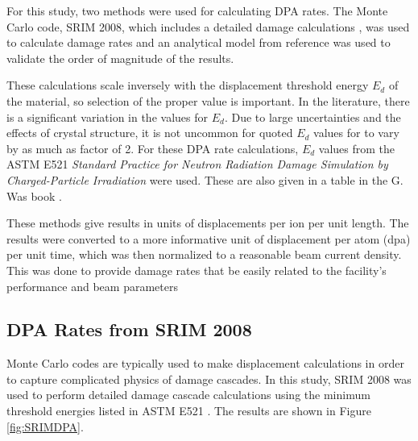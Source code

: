 \documentclass[final,3p,times,twocolumn]{elsarticle} %
\begin{document}
For this study, two methods were used for calculating DPA rates. The Monte Carlo code, SRIM 2008, which includes a detailed damage calculations \cite{SRIM}, was used to calculate damage rates and an analytical model from reference \cite{Was} was used to validate the order of magnitude of the results.  

These calculations scale inversely with the displacement threshold energy $E_d$ of the material, so selection of the proper value is important.  In the literature, there is a significant variation in the values for $E_d$. Due to large uncertainties and the effects of crystal structure, it is not uncommon for quoted $E_d$ values for to vary by as much as factor of 2.   For these DPA rate calculations, $E_d$ values from the ASTM E521 \emph{Standard Practice for Neutron Radiation Damage Simulation by Charged-Particle Irradiation} \cite{ASTME521} were used. These are also given in a table in the G. Was book \cite{Was}.  

These methods give results in units of displacements per ion per unit length.  The results were converted to a more informative unit of displacement per atom (dpa) per unit time, which was then normalized to a reasonable beam current density.  This was done to provide damage rates that be easily related to the facility's performance and beam parameters 


\subsection{DPA Rates from SRIM 2008}

Monte Carlo codes are typically used to make displacement calculations in order to capture complicated physics of damage cascades.  In this study, SRIM 2008 \cite{SRIM} was used to perform detailed damage cascade calculations using the minimum threshold energies listed in ASTM E521 \cite{ASTME521}.  The results are shown in Figure \ref{fig:SRIMDPA}. %
 
\end{document}

